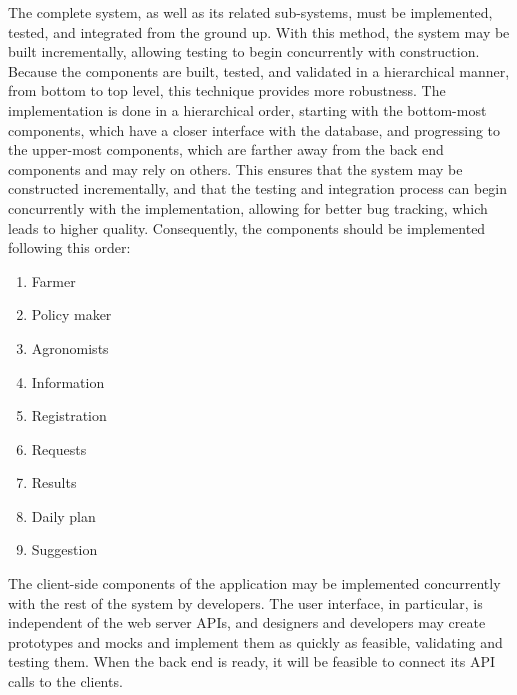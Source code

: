 \documentclass[../../main.tex]{subfiles}
\begin{document}
The complete system, as well as its related sub-systems, must be implemented, tested, and integrated from the ground up. With this method, the system may be built incrementally, allowing testing to begin concurrently with construction. Because the components are built, tested, and validated in a hierarchical manner, from bottom to top level, this technique provides more robustness.
The implementation is done in a hierarchical order, starting with the bottom-most components, which have a closer interface with the database, and progressing to the upper-most components, which are farther away from the back end components and may rely on others. This ensures that the system may be constructed incrementally, and that the testing and integration process can begin concurrently with the implementation, allowing for better bug tracking, which leads to higher quality. Consequently,  the  components  should  be  implemented following this order:


\begin{enumerate}

	\item Farmer
	\item Policy maker
	\item Agronomists
	\item Information
	\item Registration
	\item Requests
	\item Results
	\item Daily plan
	\item Suggestion

\end{enumerate}

The client-side components of the application may be implemented concurrently with the rest of the system by developers. The user interface, in particular, is independent of the web server APIs, and designers and developers may create prototypes and mocks and implement them as quickly as feasible, validating and testing them. When the back end is ready, it will be feasible to connect its API calls to the clients.
\end{document}
